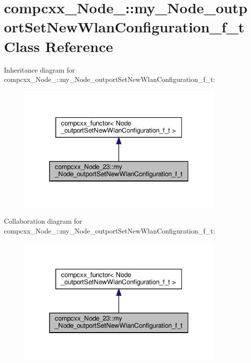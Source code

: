 \hypertarget{classcompcxx__Node__23_1_1my__Node__outportSetNewWlanConfiguration__f__t}{}\section{compcxx\+\_\+\+Node\+\_\+:\+:my\+\_\+\+Node\+\_\+outport\+Set\+New\+Wlan\+Configuration\+\_\+f\+\_\+t Class Reference}
\label{classcompcxx__Node__23_1_1my__Node__outportSetNewWlanConfiguration__f__t}


Inheritance diagram for compcxx\+\_\+\+Node\+\_\+:\+:my\+\_\+\+Node\+\_\+outport\+Set\+New\+Wlan\+Configuration\+\_\+f\+\_\+t\+:\nopagebreak
\begin{figure}[H]
\begin{center}
\leavevmode
\includegraphics[width=292pt]{classcompcxx__Node__23_1_1my__Node__outportSetNewWlanConfiguration__f__t__inherit__graph}
\end{center}
\end{figure}


Collaboration diagram for compcxx\+\_\+\+Node\+\_\+:\+:my\+\_\+\+Node\+\_\+outport\+Set\+New\+Wlan\+Configuration\+\_\+f\+\_\+t\+:\nopagebreak
\begin{figure}[H]
\begin{center}
\leavevmode
\includegraphics[width=292pt]{classcompcxx__Node__23_1_1my__Node__outportSetNewWlanConfiguration__f__t__coll__graph}
\end{center}
\end{figure}
